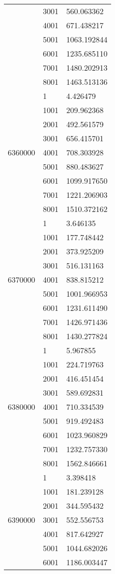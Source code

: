 \begin{table}[htb!]
\begin{tabular}{lll}
 & 3001 & 560.063362 \\
 & 4001 & 671.438217 \\
 & 5001 & 1063.192844 \\
 & 6001 & 1235.685110 \\
 & 7001 & 1480.202913 \\
 & 8001 & 1463.513136 \\
\multirow[c]{9}{*}{6360000} & 1 & 4.426479 \\
 & 1001 & 209.962368 \\
 & 2001 & 492.561579 \\
 & 3001 & 656.415701 \\
 & 4001 & 708.303928 \\
 & 5001 & 880.483627 \\
 & 6001 & 1099.917650 \\
 & 7001 & 1221.206903 \\
 & 8001 & 1510.372162 \\
\multirow[c]{9}{*}{6370000} & 1 & 3.646135 \\
 & 1001 & 177.748442 \\
 & 2001 & 373.925209 \\
 & 3001 & 516.131163 \\
 & 4001 & 838.815212 \\
 & 5001 & 1001.966953 \\
 & 6001 & 1231.611490 \\
 & 7001 & 1426.971436 \\
 & 8001 & 1430.277824 \\
\multirow[c]{9}{*}{6380000} & 1 & 5.967855 \\
 & 1001 & 224.719763 \\
 & 2001 & 416.451454 \\
 & 3001 & 589.692831 \\
 & 4001 & 710.334539 \\
 & 5001 & 919.492483 \\
 & 6001 & 1023.960829 \\
 & 7001 & 1232.757330 \\
 & 8001 & 1562.846661 \\
\multirow[c]{9}{*}{6390000} & 1 & 3.398418 \\
 & 1001 & 181.239128 \\
 & 2001 & 344.595432 \\
 & 3001 & 552.556753 \\
 & 4001 & 817.642927 \\
 & 5001 & 1044.682026 \\
 & 6001 & 1186.003447 \\

\end{tabular}
\end{table}

